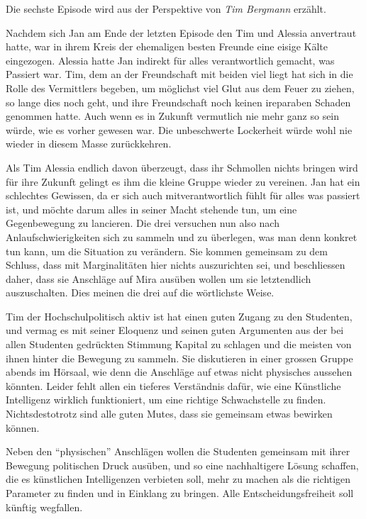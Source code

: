 \documentclass[11pt,a4paper,ngerman]{scrreprt}
\begin{document}
Die sechste Episode wird aus der Perspektive von \emph{Tim Bergmann} erzählt.

Nachdem sich Jan am Ende der letzten Episode den Tim und Alessia anvertraut
hatte, war in ihrem Kreis der ehemaligen besten Freunde eine eisige Kälte
eingezogen. Alessia hatte Jan indirekt für alles verantwortlich gemacht, was
Passiert war. Tim, dem an der Freundschaft mit beiden viel liegt hat sich in die
Rolle des Vermittlers begeben, um möglichst viel Glut aus dem Feuer zu ziehen,
so lange dies noch geht, und ihre Freundschaft noch keinen ireparaben Schaden
genommen hatte. Auch wenn es in Zukunft vermutlich nie mehr ganz so sein würde,
wie es vorher gewesen war. Die unbeschwerte Lockerheit würde wohl nie wieder in
diesem Masse zurückkehren.

Als Tim Alessia endlich davon überzeugt, dass ihr Schmollen nichts bringen wird
für ihre Zukunft gelingt es ihm die kleine Gruppe wieder zu vereinen. Jan hat
ein schlechtes Gewissen, da er sich auch mitverantwortlich fühlt für alles was
passiert ist, und möchte darum alles in seiner Macht stehende tun, um eine
Gegenbewegung zu lancieren. Die drei versuchen nun also nach
Anlaufschwierigkeiten sich zu sammeln und zu überlegen, was man denn konkret tun
kann, um die Situation zu verändern. Sie kommen gemeinsam zu dem Schluss, dass
mit Marginalitäten hier nichts auszurichten sei, und beschliessen daher, dass
sie Anschläge auf Mira ausüben wollen um sie letztendlich auszuschalten. Dies
meinen die drei auf die wörtlichste Weise.

Tim der Hochschulpolitisch aktiv ist hat einen guten Zugang zu den Studenten,
und vermag es mit seiner Eloquenz und seinen guten Argumenten aus der bei allen
Studenten gedrückten Stimmung Kapital zu schlagen und die meisten von ihnen
hinter die Bewegung zu sammeln. Sie diskutieren in einer grossen Gruppe abends
im Hörsaal, wie denn die Anschläge auf etwas nicht physisches aussehen
könnten. Leider fehlt allen ein tieferes Verständnis dafür, wie eine Künstliche
Intelligenz wirklich funktioniert, um eine richtige Schwachstelle zu
finden. Nichtsdestotrotz sind alle guten Mutes, dass sie gemeinsam etwas
bewirken können.

Neben den ``physischen'' Anschlägen wollen die Studenten gemeinsam mit ihrer
Bewegung politischen Druck ausüben, und so eine nachhaltigere Lösung schaffen,
die es künstlichen Intelligenzen verbieten soll, mehr zu machen als die
richtigen Parameter zu finden und in Einklang zu bringen. Alle
Entscheidungsfreiheit soll künftig wegfallen.
\end{document}
